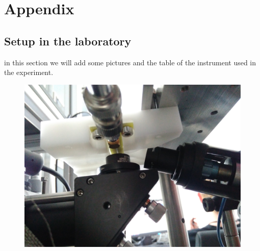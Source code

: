 \section{Appendix}

\subsection{Setup in the laboratory}
in this section we will add some pictures and the table of the instrument used in the experiment.
\begin{figure}
	\centering
	\includegraphics[width=0.7\linewidth]{../figures/IMG_20180530_153552}
	\caption{}
	\label{fig:img20180530153552}
\end{figure}

